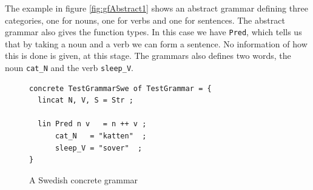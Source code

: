 \documentclass{report}
\begin{document}
The example in figure \ref{fig:gfAbstract1} shows an abstract grammar defining three categories, %
one for nouns, one for verbs and one for sentences. The abstract grammar also gives
the function types. In this case we have \verb|Pred|, which tells us that by
taking a noun and a verb we can form a sentence.  No information of how this is
done is given, at this stage. The grammars also defines two words, the noun
\verb|cat_N| and the verb \verb|sleep_V|. 

\begin{figure}[h]
\begin{verbatim}
concrete TestGrammarSwe of TestGrammar = {
  lincat N, V, S = Str ;
   
  lin Pred n v   = n ++ v ;
      cat_N   = "katten"  ;
      sleep_V = "sover"  ;
}
\end{verbatim}
\caption{A Swedish concrete grammar}
\label{fig:gfSweCnc1}
\end{figure}
\end{document}
